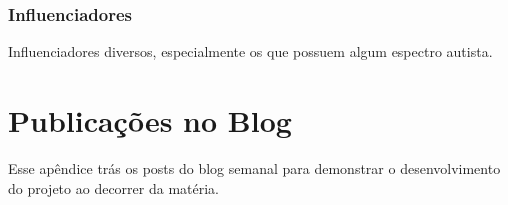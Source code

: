 \begin{apendicesenv}
\subsection{Influenciadores}
Influenciadores diversos, especialmente os que possuem algum espectro autista. 

%


\chapter{Publicações no Blog}

Esse apêndice trás os posts do blog semanal para demonstrar o desenvolvimento do projeto ao decorrer da matéria. 




\end{apendicesenv}
